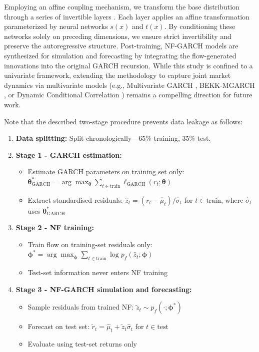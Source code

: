 \documentclass[risks,article,submit,pdftex,moreauthors]{Definitions/mdpi}
\begin{document}
Employing an affine coupling mechanism, we transform the base distribution through a series of invertible layers \citep{dinh2016density}. Each layer applies an affine transformation parameterized by neural networks $s(x)$ and $t(x)$. By conditioning these networks solely on preceding dimensions, we ensure strict invertibility and preserve the autoregressive structure. Post-training, NF-GARCH models are synthesized for simulation and forecasting by integrating the flow-generated innovations into the original GARCH recursion. While this study is confined to a univariate framework, extending the methodology to capture joint market dynamics via multivariate models (e.g., Multivariate GARCH \citep{bollerslev1990modelling}, BEKK-MGARCH \citep{engle1995multivariate}, or Dynamic Conditional Correlation \citep{engle2002dynamic}) remains a compelling direction for future work.


Note that the described two-stage procedure prevents data leakage as follows:

\begin{enumerate}
    \item \textbf{Data splitting:} Split chronologically—65\% training, 35\% test.
    
    \item \textbf{Stage 1 - GARCH estimation:} 
    \begin{itemize}
        \item Estimate GARCH parameters on training set only: $\boldsymbol{\theta}_{\text{GARCH}}^* = \arg\max_{\boldsymbol{\theta}} \sum_{t \in \text{train}} \ell_{\text{GARCH}}(r_t; \boldsymbol{\theta})$
        \item Extract standardised residuals: $\hat{z}_t = (r_t - \hat{\mu}_t) / \hat{\sigma}_t$ for $t \in \text{train}$, where $\hat{\sigma}_t$ uses $\boldsymbol{\theta}_{\text{GARCH}}^*$
    \end{itemize}
    
    \item \textbf{Stage 2 - NF training:}
    \begin{itemize}
        \item Train flow on training-set residuals only: $\boldsymbol{\phi}^* = \arg\max_{\boldsymbol{\phi}} \sum_{t \in \text{train}} \log p_f(\hat{z}_t; \boldsymbol{\phi})$
        \item Test-set information never enters NF training
    \end{itemize}
    
    \item \textbf{Stage 3 - NF-GARCH simulation and forecasting:}
    \begin{itemize}
        \item Sample residuals from trained NF: $\tilde{z}_t \sim p_f(\cdot; \boldsymbol{\phi}^*)$
        \item Forecast on test set: $\tilde{r}_t = \hat{\mu}_t + \tilde{z}_t \hat{\sigma}_t$ for $t \in \text{test}$
        \item Evaluate using test-set returns only
    \end{itemize}
\end{enumerate}
\end{document}
